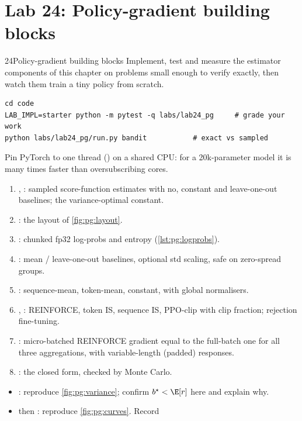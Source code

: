 \section{Lab 24: Policy-gradient building blocks}\label{sec:pg:lab}
\begin{labbox}{24}{Policy-gradient building blocks}
Implement, test and measure the estimator components of this chapter on problems small enough
to verify exactly, then watch them train a tiny policy from scratch.
\begin{lstlisting}[style=shell]
cd code
LAB_IMPL=starter python -m pytest -q labs/lab24_pg     # grade your work
python labs/lab24_pg/run.py bandit           # exact vs sampled
\end{lstlisting}
Pin PyTorch to one thread () on a shared CPU: for a 20k-parameter
model it is many times faster than oversubscribing cores.
\begin{enumerate}
\item {}, : sampled score-function estimates with no,
  constant and leave-one-out baselines; the variance-optimal constant.
\item {}: the layout of \cref{fig:pg:layout}.
\item {}: chunked fp32 log-probs and entropy (\cref{lst:pg:logprobs}).
\item {}: mean / leave-one-out baselines, optional std scaling, safe on
  zero-spread groups.
\item {}: sequence-mean, token-mean, constant, with global normalisers.
\item {}, : REINFORCE, token IS, sequence IS, PPO-clip
  with clip fraction; rejection fine-tuning.
\item {}: micro-batched REINFORCE gradient equal to the full-batch one
  for all three aggregations, with variable-length (padded) responses.
\item {}: the closed form, checked by Monte Carlo.
\end{enumerate}
\begin{itemize}
\item {}: reproduce \cref{fig:pg:variance}; confirm $b^\star<\E[r]$ here and explain why.
\item {} then : reproduce \cref{fig:pg:curves}. Record

\end{itemize}
\end{labbox}
